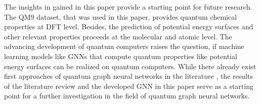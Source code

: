The insights in gained in this paper provide a starting point for future research. The QM9 dataset, that was used in this paper, provides quantum chemical properties at DFT level. Besides, the prediction of potential energy surfaces and other relevant properties proceeds at the molecular and atomic level. The advancing development of quantum computers raises the question, if machine learning models like GNNs that compute quantum properties like potential energy surfaces can be realized on quantum computers. While there already exist first approaches of quantum graph neural networks in the literature \cite{verdon_quantum_2019,beer_quantum_2021,ai_decompositional_2023}, the results of the literature review and the developed GNN in this paper serve as a starting point for a further investigation in the field of quantum graph neural networks. 

